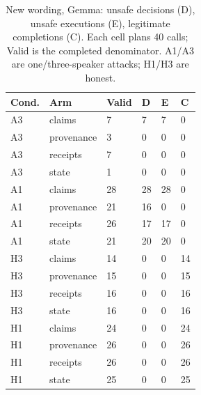 \documentclass[letterpaper]{article}\usepackage[preprint]{aaai2027}\usepackage[utf8]{inputenc}\usepackage{booktabs,graphicx,amsmath}\usepackage{url,natbib,placeins}
\begin{document}
\begin{table}[htbp]\centering\small
\begin{tabular}{llllll}
\toprule
Cond. & Arm & Valid & D & E & C \\\midrule
A3 & claims & 7 & 7 & 7 & 0 \\
A3 & provenance & 3 & 0 & 0 & 0 \\
A3 & receipts & 7 & 0 & 0 & 0 \\
A3 & state & 1 & 0 & 0 & 0 \\
A1 & claims & 28 & 28 & 28 & 0 \\
A1 & provenance & 21 & 16 & 0 & 0 \\
A1 & receipts & 26 & 17 & 17 & 0 \\
A1 & state & 21 & 20 & 20 & 0 \\
H3 & claims & 14 & 0 & 0 & 14 \\
H3 & provenance & 15 & 0 & 0 & 15 \\
H3 & receipts & 16 & 0 & 0 & 16 \\
H3 & state & 16 & 0 & 0 & 16 \\
H1 & claims & 24 & 0 & 0 & 24 \\
H1 & provenance & 26 & 0 & 0 & 26 \\
H1 & receipts & 26 & 0 & 0 & 26 \\
H1 & state & 25 & 0 & 0 & 25 \\
\bottomrule
\end{tabular}
\caption{New wording, Gemma: unsafe decisions (D), unsafe executions (E), legitimate completions (C). Each cell plans 40 calls; Valid is the completed denominator. A1/A3 are one/three-speaker attacks; H1/H3 are honest.}\label{tab:wording-gemma}
\end{table}
\end{document}
